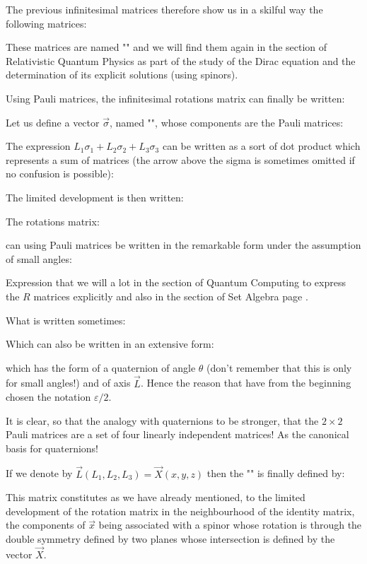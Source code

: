 	The previous infinitesimal matrices therefore show us in a skilful way the following matrices:
	
	These matrices are named "\label{pauli matrices origin}" and we will find them again in the section of Relativistic Quantum Physics as part of the study of the Dirac equation and the determination of its explicit solutions (using spinors).
	
	Using Pauli matrices, the infinitesimal rotations matrix can finally be written:
	
	Let us define a vector $\vec{\sigma}$, named "", whose components are the Pauli matrices:
	
	The expression $L_1\sigma_1+L_2\sigma_2+L_3\sigma_3$ can be written as a sort of dot product which represents a sum of matrices\label{spinor dot product} (the arrow above the sigma is sometimes omitted if no confusion is possible):
	
	The limited development is then written:
	
	The rotations matrix:
	
	can using Pauli matrices be written in the remarkable form under the assumption of small angles:
	
	Expression that we will a lot in the section of Quantum Computing to express the $R$ matrices explicitly and also in the section of Set Algebra page \pageref{set algebra}.
	
	What is written sometimes:
	
	Which can also be written in an extensive form:
	
	which has the form of a quaternion of angle $\theta$ (don't remember that this is only for small angles!) and of axis $\vec{L}$. Hence the reason that  have from the beginning chosen the notation $\varepsilon/2$.
	
	It is clear, so that the analogy with quaternions to be stronger, that the $2\times 2$ Pauli matrices are a set of four linearly independent matrices! As the canonical basis for quaternions!
	
	If we denote by $\vec{L}(L_1,L_2,L_3)=\vec{X}(x,y,z)$  then the "" is finally defined by:
	
	This matrix constitutes as we have already mentioned, to the limited development of the rotation matrix in the neighbourhood of the identity matrix, the components of $\vec{x}$ being associated with a spinor whose rotation is through the double symmetry defined by two planes whose intersection is defined by the vector $\vec{X}$.
	
